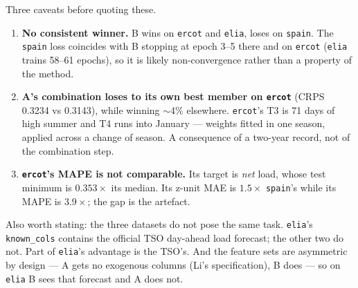 \documentclass[11pt,a4paper]{article}
\begin{document}
\noindent
Three caveats before quoting these.

\begin{enumerate}[leftmargin=1.6em,itemsep=2pt]
  \item \textbf{No consistent winner.} B wins on \texttt{ercot} and \texttt{elia}, loses on
        \texttt{spain}. The \texttt{spain} loss coincides with B stopping at epoch 3--5 there
        and on \texttt{ercot} (\texttt{elia} trains 58--61 epochs), so it is likely
        non-convergence rather than a property of the method.
  \item \textbf{A's combination loses to its own best member on \texttt{ercot}} (CRPS 0.3234
        vs 0.3143), while winning $\sim$4\% elsewhere. \texttt{ercot}'s T3 is 71 days of high
        summer and T4 runs into January --- weights fitted in one season, applied across a
        change of season. A consequence of a two-year record, not of the combination step.
  \item \textbf{\texttt{ercot}'s MAPE is not comparable.} Its target is \emph{net} load, whose
        test minimum is $0.353\times$ its median. Its z-unit MAE is $1.5\times$
        \texttt{spain}'s while its MAPE is $3.9\times$; the gap is the artefact.
\end{enumerate}

\noindent
Also worth stating: the three datasets do not pose the same task. \texttt{elia}'s
\texttt{known\_cols} contains the official TSO day-ahead load forecast; the other two do not.
Part of \texttt{elia}'s advantage is the TSO's. And the feature sets are asymmetric by design
--- A gets no exogenous columns (Li's specification), B does --- so on \texttt{elia} B sees
that forecast and A does not.
\end{document}
